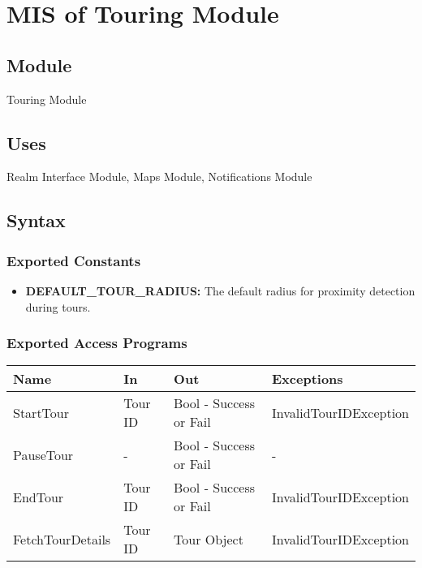 \documentclass[12pt, titlepage]{article}
\begin{document}
\newpage

\section{MIS of Touring Module} \label{TouringModule}

\subsection{Module}

Touring Module

\subsection{Uses}

Realm Interface Module, Maps Module, Notifications Module

\subsection{Syntax}

\subsubsection{Exported Constants}

\begin{itemize}
  \item \textbf{DEFAULT\_TOUR\_RADIUS:} The default radius for proximity detection during tours.
\end{itemize}

\subsubsection{Exported Access Programs}

\begin{center}
  \begin{tabular}{p{4cm} p{2cm} p{4cm} p{4cm}}
    \hline
    \textbf{Name}    & \textbf{In} & \textbf{Out}           & \textbf{Exceptions}    \\
    \hline
    StartTour        & Tour ID     & Bool - Success or Fail & InvalidTourIDException \\
    \hline
    PauseTour        & -           & Bool - Success or Fail & -                      \\
    \hline
    EndTour          & Tour ID     & Bool - Success or Fail & InvalidTourIDException \\
    \hline
    FetchTourDetails & Tour ID     & Tour Object            & InvalidTourIDException \\
    \hline
  \end{tabular}
\end{center}
\end{document}
